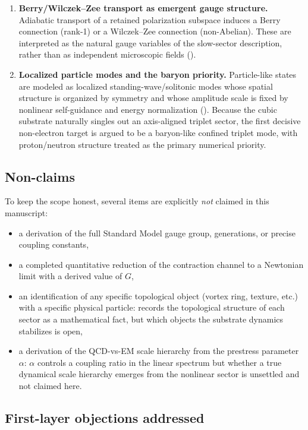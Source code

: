 \begin{enumerate}
\item \textbf{Berry/Wilczek--Zee transport as emergent gauge structure.}
Adiabatic transport of a retained polarization subspace induces a Berry connection (rank-1) or a Wilczek--Zee
connection (non-Abelian).
These are interpreted as the natural gauge variables of the slow-sector description, rather than as independent
microscopic fields ().

\item \textbf{Localized particle modes and the baryon priority.}
Particle-like states are modeled as localized standing-wave/solitonic modes whose spatial structure is organized by
symmetry and whose amplitude scale is fixed by nonlinear self-guidance and energy normalization ().
Because the cubic substrate naturally singles out an axis-aligned triplet sector, the first decisive non-electron target
is argued to be a baryon-like confined triplet mode, with proton/neutron structure treated as the primary numerical
priority.
\end{enumerate}

\subsection{Non-claims}
To keep the scope honest, several items are explicitly \emph{not} claimed in this manuscript:
\begin{itemize}
\item a derivation of the full Standard Model gauge group, generations, or precise coupling constants,
\item a completed quantitative reduction of the contraction channel to a Newtonian limit with a derived value of $G$,
\item an identification of any specific topological object (vortex ring, texture, etc.) with a specific physical
particle:  records the topological structure of each sector as a mathematical fact, but
which objects the substrate dynamics stabilizes is open,
\item a derivation of the QCD-vs-EM scale hierarchy from the prestress parameter $\alpha$: $\alpha$ controls a
coupling ratio in the linear spectrum but whether a true dynamical scale hierarchy emerges from the nonlinear sector
is unsettled and not claimed here.
\end{itemize}

\subsection{First-layer objections addressed}
\label{subsec:attack-responses}

